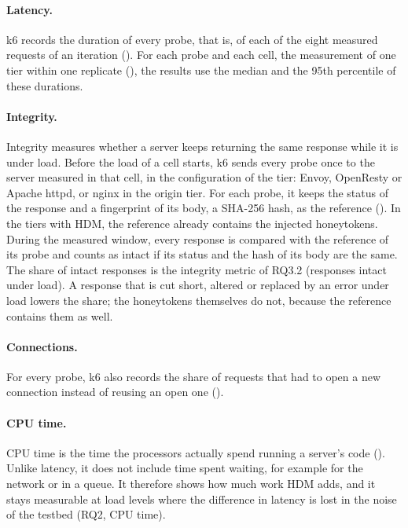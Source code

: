 \documentclass{rptuma}
\begin{document}
\paragraph{Latency.} k6 records the duration of every probe, that is, of each of the eight
measured requests of an iteration (). For each probe and each cell, the
measurement of one tier within one replicate (), the results use the
median and the 95th percentile of these durations.

\paragraph{Integrity.} Integrity measures whether a server keeps returning the same response while
it is under load. Before the load of a cell starts, k6 sends every probe once to the server measured
in that cell, in the configuration of the tier: Envoy, OpenResty or Apache httpd, or nginx in the
origin tier. For each probe, it keeps the status of the response and a fingerprint of its body, a
SHA-256 hash, as the reference (). In the tiers with HDM, the reference
already contains the injected honeytokens. During the measured window, every response is compared
with the reference of its probe and counts as intact if its status and the hash of its body are the
same. The share of intact responses is the integrity metric of RQ3.2 (responses intact under load).
A response that is cut short, altered or replaced by an error under load lowers the share; the
honeytokens themselves do not, because the reference contains them as well.

\paragraph{Connections.} For every probe, k6 also records the share of requests that had to open a
new connection instead of reusing an open one ().

\paragraph{CPU time.} CPU time is the time the processors actually spend running a server's code
(). Unlike latency, it does not include time spent waiting, for example for
the network or in a queue. It therefore shows how much work HDM adds, and it stays measurable at
load levels where the difference in latency is lost in the noise of the testbed (RQ2, CPU time).
\end{document}
